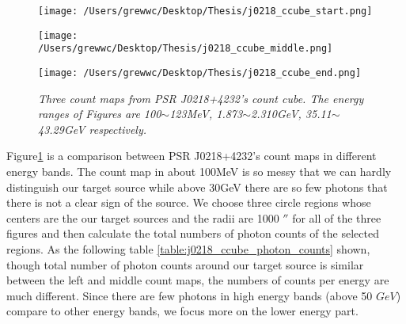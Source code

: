 \documentclass[12pt]{report}
\newcommand{\mycaption}[1]{\caption{\textit{\footnotesize #1}}}
\begin{document}
          \begin{figure}[!ht]
            \begin{minipage}{0.32\textwidth}
              \begin{center} 
                \texttt{[image: /Users/grewwc/Desktop/Thesis/j0218\_ccube\_start.png]}
              \end{center}
            \end{minipage}
            \begin{minipage}{0.32\textwidth}
              \begin{center}
                \texttt{[image: /Users/grewwc/Desktop/Thesis/j0218\_ccube\_middle.png]}
              \end{center}
            \end{minipage}
            \begin{minipage}{0.32\textwidth}
              \begin{center}
              \texttt{[image: /Users/grewwc/Desktop/Thesis/j0218\_ccube\_end.png]}
              \end{center}
            \end{minipage}
            \mycaption{Three count maps from PSR J0218+4232's count cube. The energy ranges of Figures are 
              100$\sim$123MeV, 1.873$\sim$2.310GeV, 35.11$\sim$43.29GeV respectively.}
            \label{fig: j0218_ccube_bin_1_and_15}
          \end{figure}
          
          Figure\ref{fig: j0218_ccube_bin_1_and_15} is a comparison between PSR J0218+4232's count maps in different energy 
          bands. The count map in about 100MeV is so messy that we can hardly distinguish our target source 
          while above 30GeV there are so few photons that there is not a clear sign of the source. 
          We choose three circle regions whose centers are the our target sources and the radii are 1000 $''$ for 
          all of the three figures and then calculate the total numbers of photon counts of the selected regions. 
          As the following table \ref{table:j0218_ccube_photon_counts}
          shown, though total number of photon counts around our target source is similar between the left and middle
          count maps, the 
          numbers of counts per energy are much different. Since there are few photons in high energy bands 
          (above 50 $GeV$) compare to other energy bands, we focus more on the lower energy part. 
\end{document}
